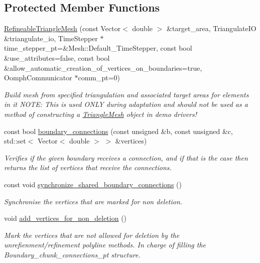 \subsection*{Protected Member Functions}
\begin{DoxyCompactItemize}
\item 
\hyperlink{classoomph_1_1RefineableTriangleMesh_a488004263be96473c332468e13e80a83}{Refineable\+Triangle\+Mesh} (const Vector$<$ double $>$ \&target\+\_\+area, Triangulate\+IO \&triangulate\+\_\+io, Time\+Stepper $\ast$time\+\_\+stepper\+\_\+pt=\&Mesh\+::\+Default\+\_\+\+Time\+Stepper, const bool \&use\+\_\+attributes=false, const bool \&allow\+\_\+automatic\+\_\+creation\+\_\+of\+\_\+vertices\+\_\+on\+\_\+boundaries=true, Oomph\+Communicator $\ast$comm\+\_\+pt=0)
\begin{DoxyCompactList}\small\item\em Build mesh from specified triangulation and associated target areas for elements in it N\+O\+TE\+: This is used O\+N\+LY during adaptation and should not be used as a method of constructing a \hyperlink{classoomph_1_1TriangleMesh}{Triangle\+Mesh} object in demo drivers! \end{DoxyCompactList}\item 
const bool \hyperlink{classoomph_1_1RefineableTriangleMesh_a44ebcc99018e3d6795eca66ea20628b0}{boundary\+\_\+connections} (const unsigned \&b, const unsigned \&c, std\+::set$<$ Vector$<$ double $>$ $>$ \&vertices)
\begin{DoxyCompactList}\small\item\em Verifies if the given boundary receives a connection, and if that is the case then returns the list of vertices that receive the connections. \end{DoxyCompactList}\item 
const void \hyperlink{classoomph_1_1RefineableTriangleMesh_ad9966aa29b0174bdddf6b1584a03f59f}{synchronize\+\_\+shared\+\_\+boundary\+\_\+connections} ()
\begin{DoxyCompactList}\small\item\em Synchronise the vertices that are marked for non deletion. \end{DoxyCompactList}\item 
void \hyperlink{classoomph_1_1RefineableTriangleMesh_ae876bda052e22ece09c21ff531aac8d2}{add\+\_\+vertices\+\_\+for\+\_\+non\+\_\+deletion} ()
\begin{DoxyCompactList}\small\item\em Mark the vertices that are not allowed for deletion by the unrefienment/refinement polyline methods. In charge of filling the Boundary\+\_\+chunk\+\_\+connections\+\_\+pt structure. \end{DoxyCompactList}\item 

\end{DoxyCompactItemize}
